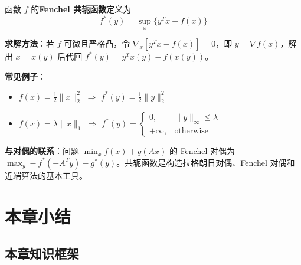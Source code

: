 \begin{notebox}
函数 $f$ 的\textbf{Fenchel 共轭函数}定义为
\[
f^*(y) = \sup_x \{y^T x - f(x)\}
\]

\textbf{求解方法}：若 $f$ 可微且严格凸，令 $\nabla_x [y^T x - f(x)] = 0$，即 $y = \nabla f(x)$，解出 $x = x(y)$ 后代回 $f^*(y) = y^T x(y) - f(x(y))$。

\textbf{常见例子}：
\begin{itemize}[itemsep=0.2em]
    \item $f(x) = \frac{1}{2}\|x\|_2^2$ $\Rightarrow$ $f^*(y) = \frac{1}{2}\|y\|_2^2$
    \item $f(x) = \lambda\|x\|_1$ $\Rightarrow$ $f^*(y) = \begin{cases} 0, & \|y\|_\infty \leq \lambda \\ +\infty, & \text{otherwise} \end{cases}$
\end{itemize}

\textbf{与对偶的联系}：问题 $\min_x f(x) + g(Ax)$ 的 Fenchel 对偶为 $\max_y -f^*(-A^T y) - g^*(y)$。共轭函数是构造拉格朗日对偶、Fenchel 对偶和近端算法的基本工具。
\end{notebox}

\section{本章小结}\label{sec:ch3-summary}

\subsection{本章知识框架}

